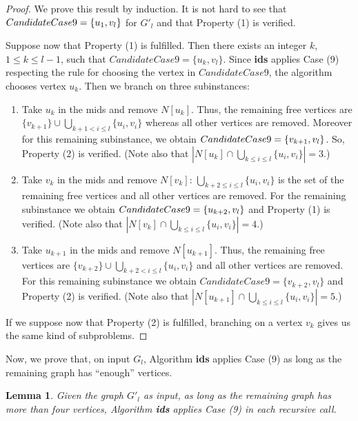 \documentclass[a4paper,10pt]{article}
\theoremstyle{plain}
\newtheorem{lemma}[theorem]{Lemma}
\theoremstyle{definition}
\theoremstyle{remark}
\newcommand{\mids}{mids\xspace}
\begin{document}
\begin{proof}
We prove this result by induction. It is not hard to see that $Candidate\-Case9=\{u_1,v_l\}$
for $G'_l$ and that Property (1) is verified.

Suppose now that Property (1) is fulfilled. Then there exists an integer $k$, $1\leq k \leq l-1$,
such that $CandidateCase9 = \{ u_k, v_l \}$.
Since {\bf ids} applies Case (9) respecting the rule for choosing the vertex in $CandidateCase9$,
the algorithm chooses vertex $u_k$.
Then we branch on three subinstances:
\begin{enumerate}[(b1)]
\item Take $u_k$ in the \mids and remove $N[u_k]$.
Thus, the remaining free vertices are $\{v_{k+1} \} \cup \bigcup_{k+1< i\leq l} \{u_i,v_i\}$
whereas all other vertices are removed. Moreover for this remaining
subinstance, we obtain $Candidate\-Case9=\{ v_{k+1}, v_l \}$. So, Property
(2) is verified.
(Note also that $|N[u_k] \cap \bigcup_{k\leq i\leq l} \{u_i,v_i\}| = 3$.)

\item Take $v_k$ in the \mids and remove $N[v_k]$:
$\bigcup_{k+2\leq i\leq l} \{u_i,v_i\}$ is the set of the remaining free vertices
and all other vertices are removed. For the remaining
subinstance we obtain $Candidate\-Case9=\{ u_{k+2}, v_l \}$
and Property (1) is verified.
(Note also that $|N[v_k] \cap \bigcup_{k\leq i\leq l} \{u_i,v_i\}| = 4$.)

\item Take $u_{k+1}$ in the \mids and remove $N[u_{k+1}]$. Thus,
the remaining free vertices are $\{v_{k+2} \} \cup \bigcup_{k+2< i\leq l} \{u_i,v_i\}$
and all other vertices are removed. For this remaining
subinstance we obtain $CandidateCase9=\{ v_{k+2}, v_l \}$
and Property (2) is verified.
(Note also that $|N[u_{k+1}] \cap \bigcup_{k\leq i\leq l} \{u_i,v_i\}| = 5$.)
\end{enumerate}

If we suppose now that Property (2) is fulfilled, branching on
a vertex $v_k$ gives us the same kind of subproblems.
\end{proof}

Now, we prove that, on input $G_l$,
Algorithm {\bf ids} applies Case (9) as long as
the remaining graph has ``enough'' vertices.

\begin{lemma}
Given the graph $G'_l$ as input,
as long as the remaining graph has more than four vertices,
Algorithm {\bf ids} applies Case (9) in each recursive call.
\end{lemma}
\end{document}

